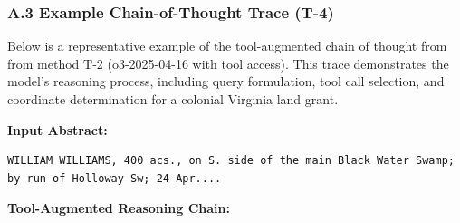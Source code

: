 \documentclass[
  10pt,
  twocolumn]{article}
\begin{document}
\subsubsection{A.3 Example Chain-of-Thought Trace
(T-4)}\label{app-cot-trace}

Below is a representative example of the tool-augmented chain of thought
from from method T-2 (o3-2025-04-16 with tool access). This trace
demonstrates the model's reasoning process, including query formulation,
tool call selection, and coordinate determination for a colonial
Virginia land grant.

\textbf{Input Abstract:}

\begin{lstlisting}
WILLIAM WILLIAMS, 400 acs., on S. side of the main Black Water Swamp; by run of Holloway Sw; 24 Apr....
\end{lstlisting}

\textbf{Tool-Augmented Reasoning Chain:}
\end{document}
